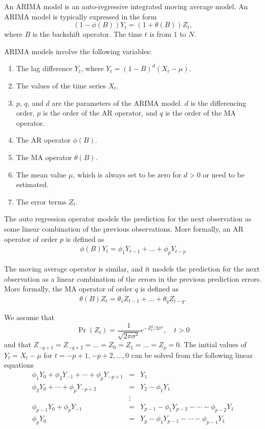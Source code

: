 \documentclass[english,12pt]{article}
\begin{document}
An ARIMA model is an auto-regressive integrated moving average model. An ARIMA
model is typically expressed in the form
\begin{equation}
(1 - \phi(B)) Y_t  = (1 + \theta(B)) Z_t,
\end{equation}
where $B$ is the backshift operator. The time $t$ is from $1$ to $N$.

ARIMA models involve the following variables:
\begin{enumerate}
   \item The lag difference $Y_{t}$, where  $Y_{t} = (1-B)^{d}(X_{t} - \mu)$.
    \item The values of the time series $X_t$.
    \item $p$, $q$, and $d$ are the parameters of the ARIMA model.
      $d$ is the differencing order, $p$ is the order of the AR
      operator, and $q$ is the order of the MA operator.
    \item The AR operator $\phi(B)$.
    \item The MA operator $\theta(B)$.
    \item The mean value $\mu$, which is always set to be zero for
      $d>0$ or need to be estimated.
    \item The error terms $Z_t$.
\end{enumerate}

The  auto regression operator models the prediction for the next
observation  as some linear combination of the previous observations.
More formally, an AR operator of order $p$ is defined as
\begin{align}
\phi(B) Y_t= \phi_1 Y_{t-1}   + \dots +  \phi_{p} Y_{t-p}
\end{align}

The moving average operator is similar, and it models the prediction
for the next observation as a linear combination of the errors in the
previous prediction errors.  More formally, the MA operator of order
$q$ is defined as
\begin{align}
\theta(B) Z_t =   \theta_{1} Z_{t-1} + \dots + \theta_{q} Z_{t-q}.
\end{align}

We assume that
\begin{equation}
\Pr(Z_t) = \frac{1}{\sqrt{2 \pi \sigma^2}} e^{-Z^2_t/2 \sigma^2}, \quad t > 0
\end{equation}
and that  $Z_{-q+1} = Z_{-q+2} = \dots = Z_0 = Z_1 = \dots = Z_p =
0$. The initial values of $Y_t=X_t-\mu$ for $t=-p+1, -p+2, \dots,
0$ can be solved from the following linear equations
\begin{eqnarray}
\phi_1 Y_0 + \phi_2 Y_{-1} + \cdots + \phi_p Y_{-p+1} &=& Y_1 \nonumber\\
\phi_2 Y_0 + \cdots + \phi_p Y_{-p+2} &=& Y_2 - \phi_1 Y_1  \nonumber\\
&\vdots& \nonumber\\
\phi_{p-1} Y_0 + \phi_p Y_{-1} &=& Y_{p-1} - \phi_1 Y_{p-2} - \cdots -
\phi_{p-2} Y_1 \nonumber \\
\phi_p Y_0  &=& Y_p - \phi_1 Y_{p-1} - \cdots - \phi_{p-1} Y_{1} \label{eq:init_Y}
\end{eqnarray}
\end{document}
